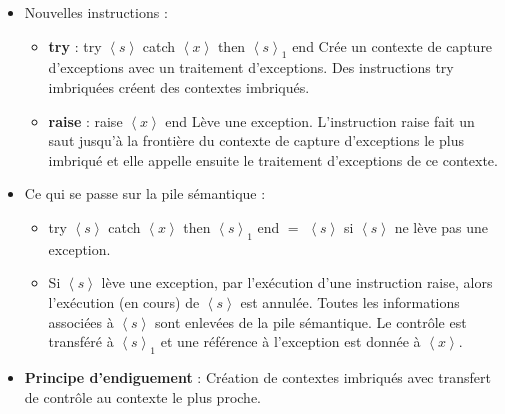 \documentclass[fr,license=none]{../../../eplsummary}
\begin{document}
\begin{flushleft}
\begin{itemize}
\item Nouvelles instructions :

\begin{itemize}[label=\textbullet]
\item \textbf{try} : \textcolor{miorangerouge}{try $\left\langle s \right\rangle$ catch $\left\langle x \right\rangle$ then $\left\langle s \right\rangle_1$ end } Crée un contexte de capture d'exceptions avec un traitement d'exceptions. Des instructions try imbriquées créent des contextes imbriqués.


\item \textbf{raise} : \textcolor{miorangerouge}{raise $\left\langle x \right\rangle$ end } Lève une exception. L'instruction raise fait un saut jusqu'à la frontière du contexte de capture d'exceptions le plus imbriqué et elle appelle ensuite le traitement d'exceptions de ce contexte.
\end{itemize}

\item Ce qui se passe sur la pile sémantique :
\begin{itemize}[label=\textbullet]
\item \textcolor{miorangerouge}{try $\left\langle s \right\rangle$ catch $\left\langle x \right\rangle$ then $\left\langle s \right\rangle_1$ end } $=$ \textcolor{miorangerouge}{$\left\langle s \right\rangle$} si \textcolor{miorangerouge}{$\left\langle s \right\rangle$} ne lève pas une exception.
\item Si \textcolor{miorangerouge}{$\left\langle s \right\rangle$} lève une exception, par l'exécution d'une instruction \textcolor{miorangerouge}{raise}, alors l'exécution (en cours) de \textcolor{miorangerouge}{$\left\langle s \right\rangle$} est annulée. Toutes les informations associées à \textcolor{miorangerouge}{$\left\langle s \right\rangle$} sont enlevées de la pile sémantique. Le contrôle est transféré à \textcolor{miorangerouge}{$\left\langle s \right\rangle_1$} et une référence à l'exception est donnée à \textcolor{miorangerouge}{$\left\langle x \right\rangle$}.

\end{itemize}

\item \textbf{Principe d'endiguement} : Création de contextes imbriqués avec transfert de contrôle au contexte le plus proche.

\end{itemize}


\end{flushleft}
\end{document}
